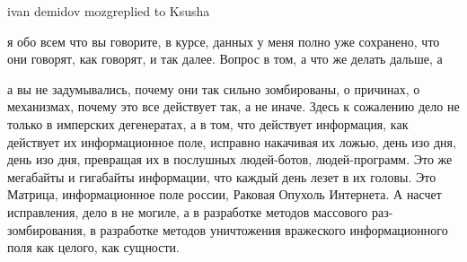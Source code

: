 ivan demidov mozgreplied to Ksusha

я обо всем что вы говорите, в курсе, данных у меня полно уже сохранено, что они
говорят, как говорят, и так далее. Вопрос в том, а что же делать дальше, а

а вы не задумывались, почему они так сильно зомбированы, о причинах, о
механизмах, почему это все действует так, а не иначе. Здесь к сожалению дело не
только в имперских дегенератах, а в том, что действует информация, как
действует их информационное поле, исправно накачивая их ложью, день изо дня,
день изо дня, превращая их в послушных людей-ботов, людей-программ. Это же
мегабайты и гигабайты информации, что каждый день лезет в их головы. Это
Матрица, информационное поле россии, Раковая Опухоль Интернета. А насчет
исправления, дело в не могиле, а в разработке методов массового
раз-зомбирования, в разработке методов уничтожения вражеского информационного
поля как целого, как сущности.

